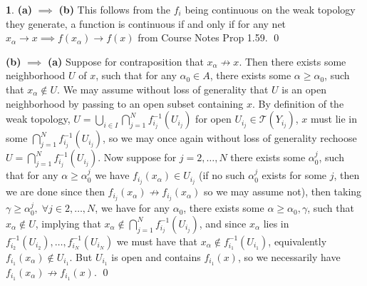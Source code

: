 \documentclass[10.5pt]{article}
\theoremstyle{definition}
\newtheorem{pb}{}
\begin{document}
    \begin{pb}
        \textbf{(a)} \(\implies\) \textbf{(b)} This follows from the \(f_i\) being continuous on the weak topology they generate, a function is continuous if and only if for any net \(x_\alpha \to x \implies f(x_\alpha) \to f(x)\) from Course Notes Prop 1.59. \qed

        \textbf{(b)} \(\implies\) \textbf{(a)} Suppose for contraposition that \(x_\alpha \not \to x\). Then there exists some neighborhood \(U\) of \(x\), such that for any \(\alpha_0 \in A\), there exists some \(\alpha \geq \alpha_0\), such that \(x_\alpha \not \in U\). We may assume without loss of generality that \(U\) is an open neighborhood by passing to an open subset containing \(x\). By definition of the weak topology, \(U = \bigcup_{i\in I}\bigcap_{j=1}^N f_{i_j}^{-1}(U_{i_j})\) for open \(U_{i_j} \in \mathcal{T}(Y_{i_j})\), \(x\) must lie in some \(\bigcap_{j=1}^N f_{i_j}^{-1}(U_{i_j})\), so we may once again without loss of generality rechoose \(U = \bigcap_{j=1}^N f_{i_j}^{-1}(U_{i_j})\). Now suppose for \(j = 2,\hdots,N\) there exists some \(\alpha_0^j\), such that for any \(\alpha \geq \alpha_0^j\) we have \(f_{i_j}(x_\alpha) \in U_{i_j}\) (if no such \(\alpha_0^j\) exists for some \(j\), then we are done since then \(f_{i_j}(x_\alpha) \not \to f_{i_j}(x_\alpha)\) so we may assume not), then taking \(\gamma \geq \alpha_0^j, \;\forall j \in 2,\hdots,N\), we have for any \(\alpha_0\), there exists some \(\alpha \geq \alpha_0, \gamma\), such that \(x_\alpha \not \in U\), implying that \(x_\alpha \not \in \bigcap_{j=1}^Nf_{i_j}^{-1}(U_{i_j})\), and since \(x_\alpha\) lies in \(f_{i_2}^{-1}(U_{i_2}),\hdots, f_{i_N}^{-1}(U_{i_N})\) we must have that \(x_\alpha \not \in f_{i_1}^{-1}(U_{i_1})\), equivalently \(f_{i_1}(x_\alpha) \not \in U_{i_1}\). But \(U_{i_1}\) is open and contains \(f_{i_1}(x)\), so we necessarily have \(f_{i_1}(x_\alpha) \not \to f_{i_1}(x)\). \qed
    \end{pb}
\end{document}
